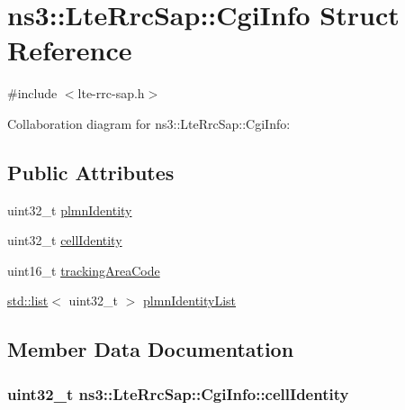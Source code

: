 \hypertarget{structns3_1_1LteRrcSap_1_1CgiInfo}{}\section{ns3\+:\+:Lte\+Rrc\+Sap\+:\+:Cgi\+Info Struct Reference}
\label{structns3_1_1LteRrcSap_1_1CgiInfo}


{\ttfamily \#include $<$lte-\/rrc-\/sap.\+h$>$}



Collaboration diagram for ns3\+:\+:Lte\+Rrc\+Sap\+:\+:Cgi\+Info\+:
\subsection*{Public Attributes}
\begin{DoxyCompactItemize}
\item 
uint32\+\_\+t \hyperlink{structns3_1_1LteRrcSap_1_1CgiInfo_a729f074bcc31dda7c48e09055393d10d}{plmn\+Identity}
\item 
uint32\+\_\+t \hyperlink{structns3_1_1LteRrcSap_1_1CgiInfo_a11e373ed474252e10ceffe860cd5370e}{cell\+Identity}
\item 
uint16\+\_\+t \hyperlink{structns3_1_1LteRrcSap_1_1CgiInfo_ab6037522e5ef68de7132f0f5732cc190}{tracking\+Area\+Code}
\item 
\hyperlink{openflow-interface_8h_afd9bcfa176617760671b67580f536fa7}{std\+::list}$<$ uint32\+\_\+t $>$ \hyperlink{structns3_1_1LteRrcSap_1_1CgiInfo_a8f6fc9d4cee9d73557e4ed389e5f89ad}{plmn\+Identity\+List}
\end{DoxyCompactItemize}


\subsection{Member Data Documentation}
\subsubsection[{\texorpdfstring{cell\+Identity}{cellIdentity}}]{\setlength{\rightskip}{0pt plus 5cm}uint32\+\_\+t ns3\+::\+Lte\+Rrc\+Sap\+::\+Cgi\+Info\+::cell\+Identity}\hypertarget{structns3_1_1LteRrcSap_1_1CgiInfo_a11e373ed474252e10ceffe860cd5370e}{}\label{structns3_1_1LteRrcSap_1_1CgiInfo_a11e373ed474252e10ceffe860cd5370e}
